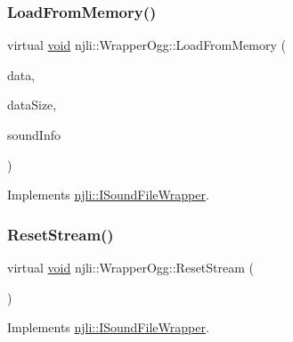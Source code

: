 \mbox{\label{classnjli_1_1_wrapper_ogg_a3ba50f99487d489f0b495cfe7fa77811}} 
\subsubsection{\texorpdfstring{Load\+From\+Memory()}{LoadFromMemory()}}
{\footnotesize\ttfamily virtual \mbox{\hyperlink{_thread_8h_af1e856da2e658414cb2456cb6f7ebc66}{void}} njli\+::\+Wrapper\+Ogg\+::\+Load\+From\+Memory (\begin{DoxyParamCaption}\item[{char $\ast$}]{data,  }\item[{int}]{data\+Size,  }\item[{Sound\+Info $\ast$}]{sound\+Info }\end{DoxyParamCaption})\hspace{0.3cm}{\ttfamily [virtual]}}



Implements \mbox{\hyperlink{classnjli_1_1_i_sound_file_wrapper_a2c4dc8cc613f8f545b0e1ead86ee7e4d}{njli\+::\+I\+Sound\+File\+Wrapper}}.

\mbox{\label{classnjli_1_1_wrapper_ogg_a28d1964b0a03208ebeb30e09ef625c90}} 
\subsubsection{\texorpdfstring{Reset\+Stream()}{ResetStream()}}
{\footnotesize\ttfamily virtual \mbox{\hyperlink{_thread_8h_af1e856da2e658414cb2456cb6f7ebc66}{void}} njli\+::\+Wrapper\+Ogg\+::\+Reset\+Stream (\begin{DoxyParamCaption}{ }\end{DoxyParamCaption})\hspace{0.3cm}{\ttfamily [virtual]}}



Implements \mbox{\hyperlink{classnjli_1_1_i_sound_file_wrapper_ab302d724c78a9a55f6dcb288d31e6854}{njli\+::\+I\+Sound\+File\+Wrapper}}.

\mbox{\label{classnjli_1_1_wrapper_ogg_adc4b8116a89e8eb48f65276ec46e8dd2}} 

